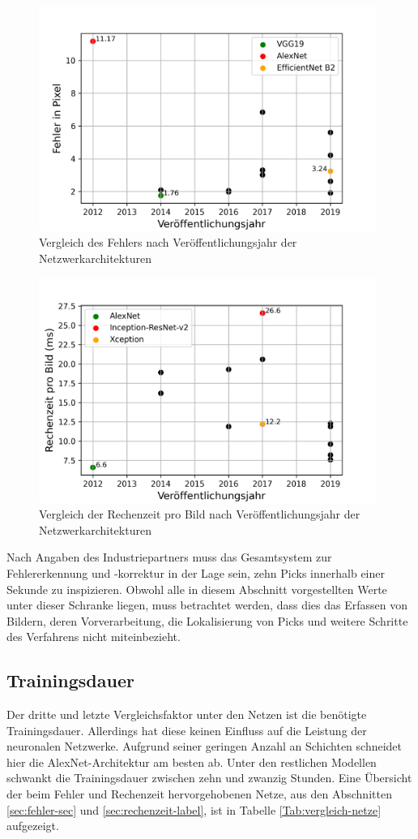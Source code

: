 \begin{figure}[h!]
\centering
\includegraphics[width=11cm]{98_images/year_error_graph.png}
\caption{Vergleich des Fehlers nach Veröffentlichungsjahr der Netzwerkarchitekturen}
\label{fig:year-error-graph}
\end{figure}

\begin{figure}[h!]
\centering
\includegraphics[width=11cm]{98_images/year_time_graph.png}
\caption{Vergleich der Rechenzeit pro Bild nach Veröffentlichungsjahr der Netzwerkarchitekturen}
\label{fig:year-time-graph}
\end{figure}

\mypar Nach Angaben des Industriepartners muss das Gesamtsystem zur Fehlererkennung und -korrektur in der Lage sein, zehn Picks innerhalb einer Sekunde zu inspizieren. Obwohl alle in diesem Abschnitt vorgestellten Werte unter dieser Schranke liegen, muss betrachtet werden, dass dies das Erfassen von Bildern, deren Vorverarbeitung, die Lokalisierung von Picks und weitere Schritte des Verfahrens nicht miteinbezieht.


\subsection{Trainingsdauer}
Der dritte und letzte Vergleichsfaktor unter den Netzen ist die benötigte Trainingsdauer. Allerdings hat diese keinen Einfluss auf die Leistung der neuronalen Netzwerke. Aufgrund seiner geringen Anzahl an Schichten schneidet hier die AlexNet-Architektur am besten ab. Unter den restlichen Modellen schwankt die Trainingsdauer zwischen zehn und zwanzig Stunden. Eine Übersicht der beim Fehler und Rechenzeit hervorgehobenen Netze, aus den Abschnitten \ref{sec:fehler-sec} und \ref{sec:rechenzeit-label}, ist in Tabelle \ref{Tab:vergleich-netze} aufgezeigt.


